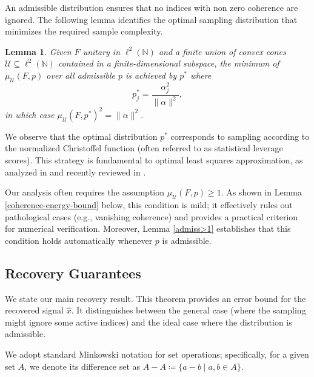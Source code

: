 \documentclass[a4paper,oneside]{amsart}
\newtheorem{lemma}[theorem]{Lemma}
\newcommand{\lnn}{\ell^2(\mathbb{N})}
\begin{document}
An admissible distribution ensures that no indices with non zero coherence are ignored. The following lemma identifies the optimal sampling distribution that minimizes the required sample complexity.

\begin{lemma}\label{best-admissible}
    Given $F$ unitary in $\lnn$ and a finite union of convex cones $\mathcal{U}\subseteq\ell^2(\mathbb{N})$ contained in a finite-dimensional subspace, the minimum of $\mu_{\mathcal{U}}(F,p)$ over all admissible $p$ is achieved by $p^*$ where
    \begin{equation}\label{pstar}
        p^*_j = \frac{\alpha^2_j}{\|\alpha\|^2},
    \end{equation}
    in which case $\mu_{\mathcal{U}}(F,p^*)^2 = \|\alpha\|^2$.
\end{lemma}
We observe that the optimal distribution $p^*$ corresponds to sampling according to the normalized Christoffel function (often referred to as statistical leverage scores). This strategy is fundamental to optimal least squares approximation, as analyzed in \cite{cohen2017optimal} and recently reviewed in \cite{adcock2025optimal}.\smallskip


Our analysis often requires the assumption $\mu_\mathcal{U}(F,p) \geq 1$. As shown in Lemma \ref{coherence-energy-bound} below, this condition is mild; it effectively rules out pathological cases (e.g., vanishing coherence) and provides a practical criterion for numerical verification. Moreover, Lemma \ref{admiss>1} establishes that this condition holds automatically whenever $p$ is admissible.

\subsection{Recovery Guarantees}

We state our main recovery result. This theorem provides an error bound for the recovered signal $\hat{x}$. It distinguishes between the general case (where the sampling might ignore some active indices) and the ideal case where the distribution is admissible.

We adopt standard Minkowski notation for set operations; specifically, for a given set $A$, we denote its difference set as $A - A \coloneqq \{ a - b \mid a, b \in A \}$.
\end{document}
